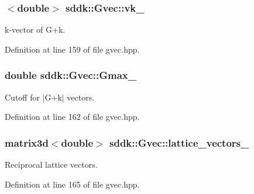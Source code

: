 \subsubsection[{vk\+\_\+}]{$<$double$>$ sddk\+::\+Gvec\+::vk\+\_\+\hspace{0.3cm}{\ttfamily [private]}}\label{classsddk_1_1_gvec_a551efdd55a49e52f00682180671a8560}


k-\/vector of G+k. 



Definition at line 159 of file gvec.\+hpp.

\hypertarget{classsddk_1_1_gvec_ac13f6091f0f60497c438add42b5e52e0}{}
\subsubsection[{Gmax\+\_\+}]{\setlength{\rightskip}{0pt plus 5cm}double sddk\+::\+Gvec\+::\+Gmax\+\_\+\hspace{0.3cm}{\ttfamily [private]}}\label{classsddk_1_1_gvec_ac13f6091f0f60497c438add42b5e52e0}


Cutoff for $\vert$\+G+k$\vert$ vectors. 



Definition at line 162 of file gvec.\+hpp.

\hypertarget{classsddk_1_1_gvec_ad07aec291ebc9cd3012add1cf5ebcd21}{}
\subsubsection[{lattice\+\_\+vectors\+\_\+}]{\setlength{\rightskip}{0pt plus 5cm}matrix3d$<$double$>$ sddk\+::\+Gvec\+::lattice\+\_\+vectors\+\_\+\hspace{0.3cm}{\ttfamily [private]}}\label{classsddk_1_1_gvec_ad07aec291ebc9cd3012add1cf5ebcd21}


Reciprocal lattice vectors. 



Definition at line 165 of file gvec.\+hpp.

\hypertarget{classsddk_1_1_gvec_af8b6dd15077c6c925d16d57fbd5a54a1}{}
